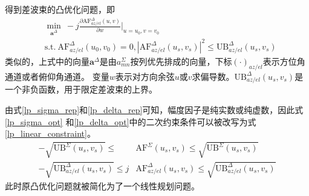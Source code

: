 \documentclass[master]{thesis-uestc}
\begin{document}
得到差波束的凸优化问题，即
\begin{equation}\label{lp_delta_opt}
    \begin{aligned}
        &\min_{\bm{a}^\Delta} ~ -j\frac{\partial\text{AF}^\Delta_{az/el}(u,v)}{\partial w}|_{u=u_0,v=v_0} \\
        &\text{s.t.} ~ \text{AF}^\Delta_{az/el}(u_0,v_0) = 0, 
        \left|\text{AF}^\Delta_{az/el}(u_s,v_s)\right|^2 \leqslant \text{UB}^\Delta_{az/el}(u_s,v_s)
    \end{aligned}
\end{equation}
类似的，上式中的向量$\bm{a}^\Delta$是由$a_{mn}^\Sigma$按列优先排成的向量，下标$(\cdot)_{az/el}$表示方位角通道或者俯仰角通道。
变量$w$表示对方向余弦$u$或$v$求偏导数。$\text{UB}^\Delta_{az/el}(u_s,v_s)$是一个非负函数，用于限定差波束的上界。

由式\eqref{lp_sigma_rep}和\eqref{lp_delta_rep}可知，幅度因子是纯实数或纯虚数，因此式\eqref{lp_sigma_opt}
和\eqref{lp_delta_opt}中的二次约束条件可以被改写为式\eqref{lp_linear_constraint}。
\begin{subequations}\label{lp_linear_constraint}
    \begin{align}
        -\sqrt{\text{UB}^\Sigma(u_s,v_s)}\leqslant&\text{AF}^\Sigma(u_s,v_s)\leqslant\sqrt{\text{UB}^\Sigma(u_s,v_s)} \\
        -\sqrt{\text{UB}^\Delta_{az/el}(u_s,v_s)}\leqslant
        j&\text{AF}^\Delta_{az/el}(u_s,v_s)\leqslant\sqrt{\text{UB}^\Delta_{az/el}(u_s,v_s)}
    \end{align}
\end{subequations}
此时原凸优化问题就被简化为了一个线性规划问题。
\end{document}
